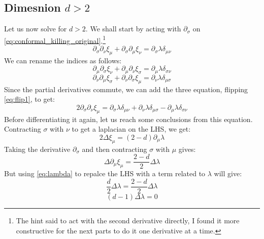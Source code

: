 \documentclass{article}
\begin{document}
\subsection{Dimesnion $d > 2$}
Let us now solve for $d > 2$. We shall start by acting with $\partial_\sigma$ on \ref{eq:conformal_killing_original}.\footnote{The hint said to act with the second derivative directly, I found it more constructive for the next parts to do it one derivative at a time.}
\begin{equation}
    \partial_\sigma\partial_\nu \xi_{\mu} + \partial_\sigma\partial_\mu \xi_{\nu} = \partial_\sigma \lambda \delta_{\mu\nu}
\end{equation}
We can rename the indices as follows:
\begin{equation}
\label{eq:flip1}
    \partial_\mu\partial_\sigma \xi_{\nu} + \partial_\mu\partial_\nu \xi_{\sigma} = \partial_\mu \lambda \delta_{\sigma\nu}
\end{equation}
\begin{equation}
    \partial_\nu\partial_\mu \xi_{\sigma} + \partial_\nu\partial_\sigma \xi_{\mu} = \partial_\nu \lambda \delta_{\mu\sigma}
\end{equation}
Since the partial derivatives commute, we can add the three equation, flipping \ref{eq:flip1}, to get:
\begin{equation}
\label{eq:conformal_second_derivative}
    2 \partial_\sigma\partial_\nu \xi_{\mu} = \partial_\sigma \lambda \delta_{\mu\nu} + \partial_\nu \lambda \delta_{\mu\sigma} - \partial_\mu \lambda \delta_{\sigma\nu}
\end{equation}
Before differentiating it again, let us reach some conclusions from this equation. Contracting $\sigma$ with $\nu$ to get a laplacian on the LHS, we get:
\begin{equation}
    2 \Delta \xi_\mu = (2 - d)\partial_\mu \lambda
\end{equation}
Taking the derivative $\partial_\sigma$ and then contracting $\sigma$ with $\mu$ gives:
\begin{equation}
    \Delta \partial_\mu \xi_\mu = \frac{2-d}{2}\Delta \lambda
\end{equation}
But using \ref{eq:lambda} to repalce the LHS with a term related to $\lambda$ will give:
\begin{equation}
    \frac{d}{2} \Delta \lambda = \frac{2-d}{2}\Delta \lambda
\end{equation}
\begin{equation}
\label{eq:delta_lambda}
    (d-1) \Delta \lambda = 0
\end{equation}
\end{document}
